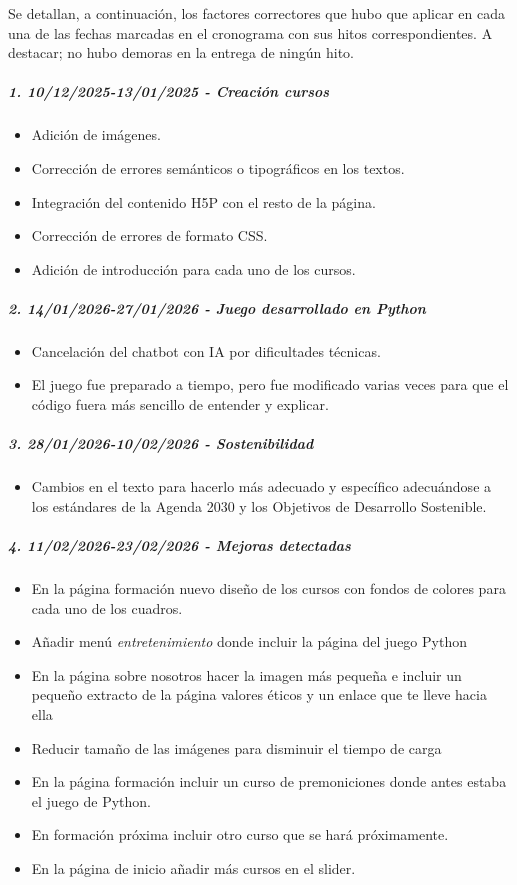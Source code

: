 \documentclass[11.5pt]{article}
\begin{document}
	Se detallan, a continuación, los factores correctores que hubo que aplicar en cada una de las fechas marcadas en el cronograma con sus hitos correspondientes. A destacar; no hubo demoras en la entrega de ningún hito.
	
	\noindent\subparagraph*{1. 10/12/2025-13/01/2025 - Creación cursos}
	
	\begin{itemize}
		\item Adición de imágenes.
		\item 	Corrección de errores semánticos o tipográficos en los textos.
		\item 	Integración del contenido H5P con el resto de la página.
		\item 	Corrección de errores de formato CSS.
		\item 	Adición de introducción para cada uno de los cursos.
	\end{itemize}
	
	\noindent\subparagraph*{2. 14/01/2026-27/01/2026 - Juego desarrollado en Python}
	
	
	\begin{itemize}
		\item Cancelación del chatbot con IA por dificultades técnicas.
		\item 	El juego fue preparado a tiempo, pero fue modificado varias veces para que el código fuera más sencillo de entender y explicar.
	\end{itemize}
	
	\noindent\subparagraph*{3. 28/01/2026-10/02/2026 - Sostenibilidad}
	
	\begin{itemize}
		\item Cambios en el texto para hacerlo más adecuado y específico adecuándose a los estándares de la Agenda 2030 y los Objetivos de Desarrollo Sostenible.
	\end{itemize}
	
	\noindent\subparagraph*{4. 11/02/2026-23/02/2026 - Mejoras detectadas}

	\begin{itemize}
		\item En la página formación nuevo diseño de los cursos con fondos de colores para cada uno de los cuadros.
		\item 		Añadir menú \textit{entretenimiento} donde incluir la página del juego Python
		\item 		En la página sobre nosotros hacer la imagen más pequeña e incluir un pequeño extracto de la página valores éticos y un enlace que te lleve hacia ella
		\item 		Reducir tamaño de las imágenes para disminuir el tiempo de carga
		\item 		En la página formación incluir un curso de premoniciones donde antes estaba el juego de Python.
		\item 		En formación próxima incluir otro curso que se hará próximamente.
		\item 		En la página de inicio añadir más cursos en el slider.
	\end{itemize}
	
\end{document}
